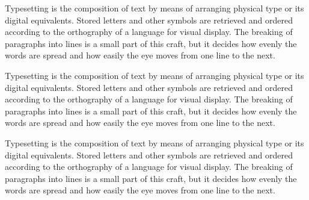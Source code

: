 \documentclass{amsart}
\begin{document}
Typesetting is the composition of text by means of arranging physical type or its digital equivalents. Stored letters and other symbols are retrieved and ordered according to the orthography of a language for visual display. The breaking of paragraphs into lines is a small part of this craft, but it decides how evenly the words are spread and how easily the eye moves from one line to the next.

Typesetting is the composition of text by means of arranging physical type or its digital equivalents. Stored letters and other symbols are retrieved and ordered according to the orthography of a language for visual display. The breaking of paragraphs into lines is a small part of this craft, but it decides how evenly the words are spread and how easily the eye moves from one line to the next.

Typesetting is the composition of text by means of arranging physical type or its digital equivalents. Stored letters and other symbols are retrieved and ordered according to the orthography of a language for visual display. The breaking of paragraphs into lines is a small part of this craft, but it decides how evenly the words are spread and how easily the eye moves from one line to the next.
\end{document}
